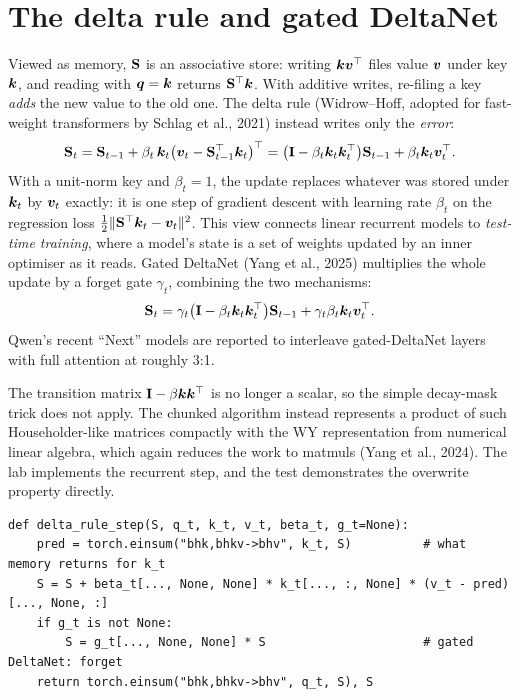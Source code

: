 \section{The delta rule and gated DeltaNet}\label{sec:attnalt:delta}

Viewed as memory, $\mathbf{S}$ is an associative store: writing $\bm{k}\bm{v}^\top$ files value
$\bm{v}$ under key $\bm{k}$, and reading with $\bm{q}=\bm{k}$ returns $\mathbf{S}^\top\bm{k}$. With
additive writes, re-filing a key \emph{adds} the new value to the old one. The delta rule (Widrow--Hoff,
adopted for fast-weight transformers by Schlag et al., 2021) instead writes only the \emph{error}:
\begin{equation}
\mathbf{S}_t=\mathbf{S}_{t-1}+\beta_t\,\bm{k}_t\big(\bm{v}_t-\mathbf{S}_{t-1}^\top\bm{k}_t\big)^\top
=\big(\mathbf{I}-\beta_t\bm{k}_t\bm{k}_t^\top\big)\mathbf{S}_{t-1}+\beta_t\bm{k}_t\bm{v}_t^\top .
\label{eq:attnalt:delta}
\end{equation}
With a unit-norm key and $\beta_t=1$, the update replaces whatever was stored under $\bm{k}_t$ by
$\bm{v}_t$ exactly: it is one step of gradient descent with learning rate $\beta_t$ on the regression loss
$\frac12\|\mathbf{S}^\top\bm{k}_t-\bm{v}_t\|^2$. This view connects linear recurrent models to
\emph{test-time training}, where a model's state is a set of weights updated by an inner optimiser as it
reads. Gated DeltaNet (Yang et al., 2025) multiplies the whole update by a forget gate $\gamma_t$, combining
the two mechanisms:
\[
\mathbf{S}_t=\gamma_t\big(\mathbf{I}-\beta_t\bm{k}_t\bm{k}_t^\top\big)\mathbf{S}_{t-1}+\gamma_t\beta_t\bm{k}_t\bm{v}_t^\top .
\]
Qwen's recent ``Next'' models are reported to interleave gated-DeltaNet layers with full attention at
roughly 3:1.

The transition matrix $\mathbf{I}-\beta\bm{k}\bm{k}^\top$ is no longer a scalar, so the simple decay-mask
trick does not apply. The chunked algorithm instead represents a product of such Householder-like matrices
compactly with the WY representation from numerical linear algebra, which again reduces the work to
matmuls (Yang et al., 2024). The lab implements the recurrent step, and the test demonstrates the
overwrite property directly.

\begin{lstlisting}[caption={One delta-rule step (Lab 8, Task 4).},label={lst:attnalt:delta}]
def delta_rule_step(S, q_t, k_t, v_t, beta_t, g_t=None):
    pred = torch.einsum("bhk,bhkv->bhv", k_t, S)          # what memory returns for k_t
    S = S + beta_t[..., None, None] * k_t[..., :, None] * (v_t - pred)[..., None, :]
    if g_t is not None:
        S = g_t[..., None, None] * S                      # gated DeltaNet: forget
    return torch.einsum("bhk,bhkv->bhv", q_t, S), S
\end{lstlisting}

